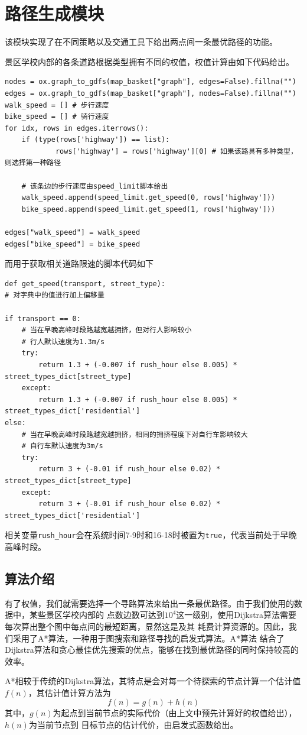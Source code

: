 \documentclass{report}
\begin{document}
\section{路径生成模块}
该模块实现了在不同策略以及交通工具下给出两点间一条最优路径的功能。
\par
景区学校内部的各条道路根据类型拥有不同的权值，权值计算由如下代码给出。
\begin{verbatim}
nodes = ox.graph_to_gdfs(map_basket["graph"], edges=False).fillna("")
edges = ox.graph_to_gdfs(map_basket["graph"], nodes=False).fillna("")
walk_speed = [] # 步行速度
bike_speed = [] # 骑行速度
for idx, rows in edges.iterrows():
    if (type(rows['highway']) == list):
            rows['highway'] = rows['highway'][0] # 如果该路具有多种类型，则选择第一种路径
    
    # 该条边的步行速度由speed_limit脚本给出
    walk_speed.append(speed_limit.get_speed(0, rows['highway']))
    bike_speed.append(speed_limit.get_speed(1, rows['highway']))
    
edges["walk_speed"] = walk_speed
edges["bike_speed"] = bike_speed
\end{verbatim}
而用于获取相关道路限速的脚本代码如下
\begin{verbatim}
def get_speed(transport, street_type):
# 对字典中的值进行加上偏移量

if transport == 0:
    # 当在早晚高峰时段路越宽越拥挤，但对行人影响较小
    # 行人默认速度为1.3m/s
    try:
        return 1.3 + (-0.007 if rush_hour else 0.005) * street_types_dict[street_type]
    except:
        return 1.3 + (-0.007 if rush_hour else 0.005) * street_types_dict['residential']
else:
    # 当在早晚高峰时段路越宽越拥挤，相同的拥挤程度下对自行车影响较大
    # 自行车默认速度为3m/s
    try:
        return 3 + (-0.01 if rush_hour else 0.02) * street_types_dict[street_type]
    except:
        return 3 + (-0.01 if rush_hour else 0.02) * street_types_dict['residential']
\end{verbatim}
相关变量\verb|rush_hour|会在系统时间7-9时和16-18时被置为\verb|true|，代表当前处于早晚高峰时段。
\subsection{算法介绍}
有了权值，我们就需要选择一个寻路算法来给出一条最优路径。由于我们使用的数据中，某些景区学校内部的
点数边数可达到$10^4$这一级别，使用Dijkstra算法需要每次算出整个图中每点间的最短距离，显然这是及其
耗费计算资源的。因此，我们采用了A*算法，一种用于图搜索和路径寻找的启发式算法。A*算法
结合了Dijkstra算法和贪心最佳优先搜索的优点，能够在找到最优路径的同时保持较高的效率。
\par
A*相较于传统的Dijkstra算法，其特点是会对每一个待探索的节点计算一个估计值$f(n)$，其估计值计算方法为
$$
f(n)=g(n)+h(n)
$$
其中，$g(n)$为起点到当前节点的实际代价（由上文中预先计算好的权值给出），$h(n)$为当前节点到
目标节点的估计代价，由启发式函数给出。
\end{document}
